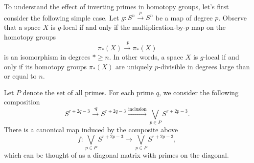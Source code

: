         



To understand the effect of inverting primes in homotopy groups, let's first consider the following simple case.
Let $g:S^n \xrightarrow{p}S^n$ be a map of degree $p$.
Observe that a space $X$ is $g$-local if and only if the multiplication-by-$p$ map on the homotopy groups
\[
\pi_{*}(X) \xrightarrow{\cdot p} \pi_{*}(X)
\]
is an isomorphism in degrees $*\geq n$. In other words, a space $X$ is $g$-local if and only if its homotopy groups $\pi_*(X)$ are uniquely $p$-divisible in degrees large than or equal to $n$.

Let $P$ denote the set of all primes. For each prime $q$, we consider the following composition 
\[
 S^{r+2q-3} 
\xrightarrow{\cdot q} S^{r+2q-3} \xrightarrow{\text{inclusion}}  \bigvee_{p \in P}S^{r+2p-3}.
\]
There is a canonical map induced by the composite above
\begin{equation}
\label{f map}
	f: \bigvee_{p\in P}S^{r+2p-3} \to \bigvee_{p\in P}S^{r+2p-3},
\end{equation}
which can be thought of as a diagonal matrix with primes on the diagonal. 

